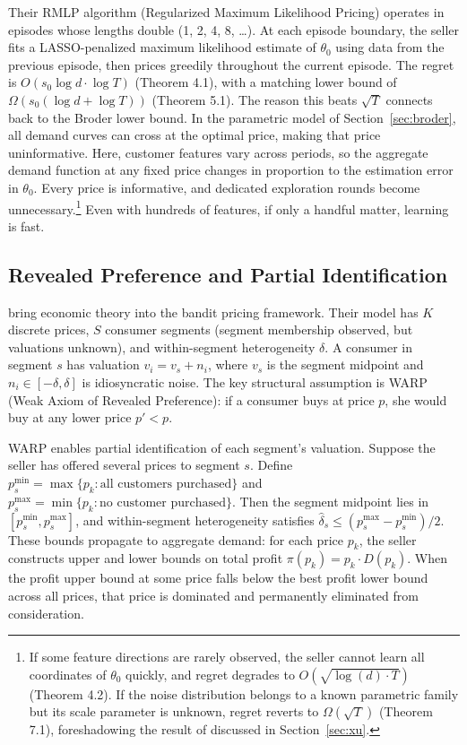 Their RMLP algorithm (Regularized Maximum Likelihood Pricing) operates in episodes whose lengths double (1, 2, 4, 8, \ldots). At each episode boundary, the seller fits a LASSO-penalized maximum likelihood estimate of $\theta_0$ using data from the previous episode, then prices greedily throughout the current episode. The regret is $O(s_0 \log d \cdot \log T)$ (Theorem 4.1), with a matching lower bound of $\Omega(s_0 (\log d + \log T))$ (Theorem 5.1). The reason this beats $\sqrt{T}$ connects back to the Broder lower bound. In the parametric model of Section~\ref{sec:broder}, all demand curves can cross at the optimal price, making that price uninformative. Here, customer features vary across periods, so the aggregate demand function at any fixed price changes in proportion to the estimation error in $\theta_0$. Every price is informative, and dedicated exploration rounds become unnecessary.\footnote{If some feature directions are rarely observed, the seller cannot learn all coordinates of $\theta_0$ quickly, and regret degrades to $O(\sqrt{\log(d) \cdot T})$ (Theorem 4.2). If the noise distribution belongs to a known parametric family but its scale parameter is unknown, regret reverts to $\Omega(\sqrt{T})$ (Theorem 7.1), foreshadowing the result of \citet{Xu2021} discussed in Section~\ref{sec:xu}.} Even with hundreds of features, if only a handful matter, learning is fast.

\subsection{Revealed Preference and Partial Identification}
\label{sec:misra}

\citet{Misra2019} bring economic theory into the bandit pricing framework. Their model has $K$ discrete prices, $S$ consumer segments (segment membership observed, but valuations unknown), and within-segment heterogeneity $\delta$. A consumer in segment $s$ has valuation $v_i = v_s + n_i$, where $v_s$ is the segment midpoint and $n_i \in [-\delta, \delta]$ is idiosyncratic noise. The key structural assumption is WARP (Weak Axiom of Revealed Preference): if a consumer buys at price $p$, she would buy at any lower price $p' < p$.

WARP enables partial identification of each segment's valuation. Suppose the seller has offered several prices to segment $s$. Define $p_s^{\min} = \max\{p_k : \text{all customers purchased}\}$ and $p_s^{\max} = \min\{p_k : \text{no customer purchased}\}$. Then the segment midpoint lies in $[p_s^{\min}, p_s^{\max}]$, and within-segment heterogeneity satisfies $\hat{\delta}_s \leq (p_s^{\max} - p_s^{\min})/2$. These bounds propagate to aggregate demand: for each price $p_k$, the seller constructs upper and lower bounds on total profit $\pi(p_k) = p_k \cdot D(p_k)$. When the profit upper bound at some price falls below the best profit lower bound across all prices, that price is dominated and permanently eliminated from consideration.

